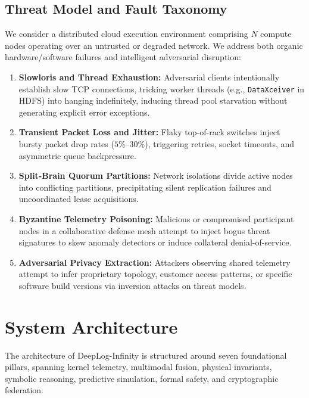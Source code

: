 \documentclass[letterpaper,twocolumn,10pt]{article}
\begin{document}
\subsection{Threat Model and Fault Taxonomy}
We consider a distributed cloud execution environment comprising $N$ compute nodes operating over an untrusted or degraded network. We address both organic hardware/software failures and intelligent adversarial disruption:
\begin{enumerate}[leftmargin=*]
    \item \textbf{Slowloris and Thread Exhaustion:} Adversarial clients intentionally establish slow TCP connections, tricking worker threads (e.g., \texttt{DataXceiver} in HDFS) into hanging indefinitely, inducing thread pool starvation without generating explicit error exceptions.
    \item \textbf{Transient Packet Loss and Jitter:} Flaky top-of-rack switches inject bursty packet drop rates ($5\%\text{--}30\%$), triggering retries, socket timeouts, and asymmetric queue backpressure.
    \item \textbf{Split-Brain Quorum Partitions:} Network isolations divide active nodes into conflicting partitions, precipitating silent replication failures and uncoordinated lease acquisitions.
    \item \textbf{Byzantine Telemetry Poisoning:} Malicious or compromised participant nodes in a collaborative defense mesh attempt to inject bogus threat signatures to skew anomaly detectors or induce collateral denial-of-service.
    \item \textbf{Adversarial Privacy Extraction:} Attackers observing shared telemetry attempt to infer proprietary topology, customer access patterns, or specific software build versions via inversion attacks on threat models.
\end{enumerate}

\section{System Architecture}
\label{sec:architecture}
The architecture of DeepLog-Infinity is structured around seven foundational pillars, spanning kernel telemetry, multimodal fusion, physical invariants, symbolic reasoning, predictive simulation, formal safety, and cryptographic federation.
\end{document}
